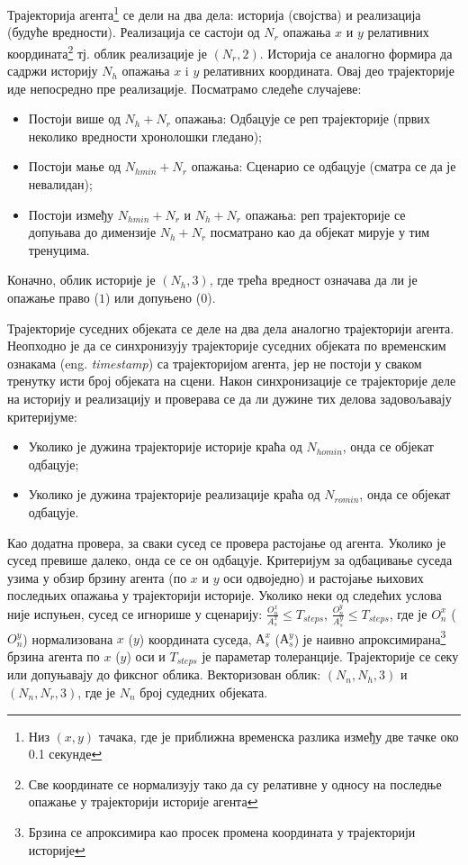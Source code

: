 \documentclass[11pt,oneside]{memoir}
\begin{document}
Трајекторија агента\footnote{Низ $(x, y)$ тачака, где је приближна временска разлика између две тачке око 0.1 секунде} 
се дели на два дела: историја (својства) и реализација (будуће вредности). Реализација се састоји од $N_r$ 
опажања $x$ и $y$ релативних координата\footnote{Све координате се нормализују тако да су релативне у односу на последње опажање у трајекторији историје агента} 
тј. облик реализације је $(N_r, 2)$. 
Историја се аналогно формира да садржи историју $N_h$ опажања $x$ i $y$ релативних координата. Овај део трајекторије иде непосредно
пре реализације. Посматрамо следеће случајеве:
\begin{itemize}
  \item Постоји више од $N_h + N_r$ опажања: Одбацује се реп трајекторије (првих неколико вредности хронолошки гледано);
  \item Постоји мање од $N_{hmin} + N_r$ опажања: Сценарио се одбацује (сматра се да је невалидан);
  \item Постоји између $N_{hmin} + N_r$ и $N_h + N_r$ опажања: реп трајекторије се допуњава до димензије $N_h + N_r$ 
  посматрано као да објекат мирује у тим тренуцима.
\end{itemize}
Коначно, облик историје је $(N_h, 3)$, где трећа вредност означава да ли је опажање право ($1$) или допуњено ($0$).

Трајекторије суседних објеката се деле на два дела аналогно трајекторији агента. Неопходно је да се синхронизују трајекторије 
суседних објеката по временским ознакама (eng. \textit{timestamp}) са трајекторијом агента, јер не постоји у сваком тренутку исти
број објеката на сцени. Након синхронизације се трајекторије деле на историју и реализацију и проверава се да ли дужине тих
делова задовољавају критеријуме:
\begin{itemize}
  \item Уколико је дужина трајекторије историје краћа од $N_{homin}$, онда се објекат одбацује;
  \item Уколико је дужина трајекторије реализације краћа од $N_{romin}$, онда се објекат одбацује.
\end{itemize}
Као додатна провера, за сваки сусед се провера растојање од агента. Уколико је сусед превише далеко, онда се се он одбацује.
Критеријум за одбацивање суседа узима у обзир брзину агента (по $x$ и $y$ оси одвоједно) и растојање њихових последњих опажања
у трајекторији историје. Уколико неки од следећих услова није
испуњен, сусед се игнорише у сценарију: $\frac{O_n^x}{A_s^x} \leq T_{steps}$, $\frac{O_n^y}{A_s^y} \leq T_{steps}$,
где је $O_n^x$ ($O_n^y$) нормализована $x$ ($y$) координата суседа, $А_s^x$ ($А_s^y$) је наивно 
апроксимирана\footnote{Брзина се апроксимира као просек промена координата у трајекторији историје} брзина агента
по $x$ ($y$) оси и $T_{steps}$ је параметар толеранције.
Трајекторије се секу или допуњавају до фиксног облика. Векторизован облик: $(N_n, N_h, 3)$ и $(N_n, N_r, 3)$, где је $N_n$ број
судедних објеката. 
\end{document}
